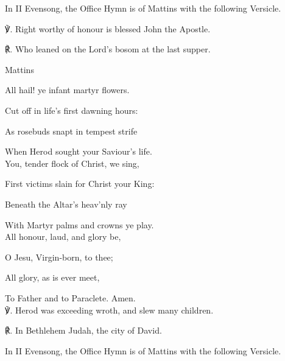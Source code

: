 \begin{rubric}
	In II Evensong, the Office Hymn is of Mattins with the following Versicle.
\end{rubric}

℣. Right worthy of honour is blessed John the Apostle.

℟. Who leaned on the Lord's bosom at the last supper.




\begin{inhead}
	Mattins
\end{inhead}

\begin{multicols}{2}
All hail! ye infant martyr flowers.

Cut off in life's first dawning hours:

As rosebuds snapt in tempest strife

When Herod sought your Saviour's life.\\

You, tender flock of Christ, we sing,

First victims slain for Christ your King:

Beneath the Altar's heav'nly ray

With Martyr palms and crowns ye play.\\

All honour, laud, and glory be,

O Jesu, Virgin-born, to thee;

All glory, as is ever meet,

To Father and to Paraclete. Amen.\\

℣. Herod was exceeding wroth, and slew many children.

℟. In Bethlehem Judah, the city of David.


\end{multicols}

\begin{rubric}
	In II Evensong, the Office Hymn is of Mattins with the following Versicle.
\end{rubric}

